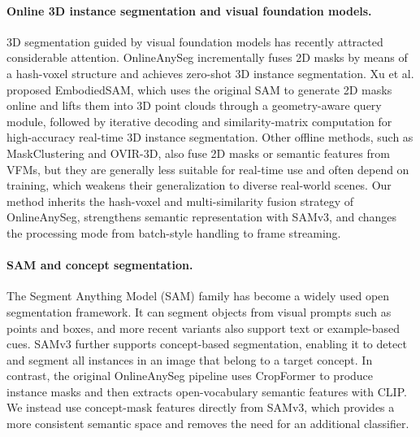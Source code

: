 \documentclass[12pt,a4paper]{article}
\begin{document}
\paragraph{Online 3D instance segmentation and visual foundation models.}
3D segmentation guided by visual foundation models has recently attracted considerable attention. OnlineAnySeg incrementally fuses 2D masks by means of a hash-voxel structure and achieves zero-shot 3D instance segmentation. Xu et al. proposed EmbodiedSAM, which uses the original SAM to generate 2D masks online and lifts them into 3D point clouds through a geometry-aware query module, followed by iterative decoding and similarity-matrix computation for high-accuracy real-time 3D instance segmentation. Other offline methods, such as MaskClustering and OVIR-3D, also fuse 2D masks or semantic features from VFMs, but they are generally less suitable for real-time use and often depend on training, which weakens their generalization to diverse real-world scenes. Our method inherits the hash-voxel and multi-similarity fusion strategy of OnlineAnySeg, strengthens semantic representation with SAMv3, and changes the processing mode from batch-style handling to frame streaming.

\paragraph{SAM and concept segmentation.}
The Segment Anything Model (SAM) family has become a widely used open segmentation framework. It can segment objects from visual prompts such as points and boxes, and more recent variants also support text or example-based cues. SAMv3 further supports concept-based segmentation, enabling it to detect and segment all instances in an image that belong to a target concept. In contrast, the original OnlineAnySeg pipeline uses CropFormer to produce instance masks and then extracts open-vocabulary semantic features with CLIP. We instead use concept-mask features directly from SAMv3, which provides a more consistent semantic space and removes the need for an additional classifier.
\end{document}

